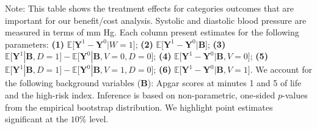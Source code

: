 \documentclass[static]{JJH-Beamer}
\begin{document}
\begin{frame}
\begin{table}[H]
\begin{center}
{\begin{tabular}{cccccccccccc}
\bottomrule
\end{tabular}
}
\end{center}
\end{table}
\vspace{-3.5mm}
{\flushleft \tiny Note: This table shows the treatment effects for categories outcomes that are important for our benefit/cost analysis. Systolic and diastolic blood pressure are measured in terms of mm Hg. Each column present estimates for the following parameters: \textbf{(1)} $\mathbb{E} \big[ \bm{Y}^1 - \bm{Y}^0 | W = 1]$; {\textbf{(2)} $\mathbb{E} \big[ \bm{Y}^1 - \bm{Y}^0 | \bm{B} \big]$}; {\textbf{(3)} $\mathbb{E} \big[ \bm{Y}^1 | \bm{B}, D=1 \big] - \mathbb{E} \big[ \bm{Y}^0 | \bm{B}, V=0, D=0 \big]$}; {\textbf{(4)} $\mathbb{E} \big[ \bm{Y}^1 - \bm{Y}^0 | \bm{B}, V=0 \big] $}; {\textbf{(5)} $\mathbb{E} \big[ \bm{Y}^1 | \bm{B}, D=1 \big] - \mathbb{E} \big[ \bm{Y}^0 | \bm{B}, V=1, D = 0 \big]$}; {\textbf{(6)} $\mathbb{E} \big[ \bm{Y}^1 - \bm{Y}^0 | \bm{B}, V=1 \big]$}. We account for the following background variables ($\bm{B}$): Apgar scores at minutes 1 and 5 of life and the high-risk index. Inference is based on non-parametric, one-sided $p$-values from the empirical bootstrap distribution. We highlight point estimates significant at the $10\%$ level. \\}

\end{frame}
\end{document}

